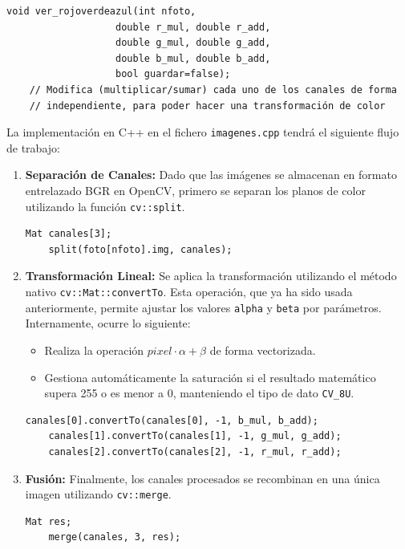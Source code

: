 \documentclass[11pt]{article}
\begin{document}
          \begin{lstlisting}[style=CppQtStyle, caption={Declaracion de enum \texttt{modelo\_color}.}, label={lst:imagenes-mc}]
    void ver_rojoverdeazul(int nfoto,
                   double r_mul, double r_add,
                   double g_mul, double g_add,
                   double b_mul, double b_add,
                   bool guardar=false);
    // Modifica (multiplicar/sumar) cada uno de los canales de forma
    // independiente, para poder hacer una transformación de color
\end{lstlisting}

          \noindent
          La implementación en C++ en el fichero \texttt{imagenes.cpp} tendrá el siguiente flujo de trabajo:

          \begin{enumerate}
              \item \textbf{Separación de Canales:} Dado que las imágenes se almacenan en formato entrelazado BGR en OpenCV, primero se separan los planos de color utilizando la función \texttt{cv::split}.

                    \begin{lstlisting}[style=CppQtStyle]
    Mat canales[3];
    split(foto[nfoto].img, canales);
\end{lstlisting}

                    \clearpage

              \item \textbf{Transformación Lineal:} Se aplica la transformación utilizando el método nativo \texttt{cv::Mat::convertTo}. Esta operación, que ya ha sido usada anteriormente, permite ajustar los valores \texttt{alpha} y \texttt{beta} por parámetros. Internamente, ocurre lo siguiente: \cite{opencv_convertTo_function}
                    \begin{itemize}
                        \item Realiza la operación $pixel \cdot \alpha + \beta$ de forma vectorizada.
                        \item Gestiona automáticamente la saturación si el resultado matemático supera 255 o
                              es menor a 0, manteniendo el tipo de dato \texttt{CV\_8U}.
                    \end{itemize}

                    \begin{lstlisting}[style=CppQtStyle]
    canales[0].convertTo(canales[0], -1, b_mul, b_add);
    canales[1].convertTo(canales[1], -1, g_mul, g_add);
    canales[2].convertTo(canales[2], -1, r_mul, r_add);
\end{lstlisting}

              \item \textbf{Fusión:} Finalmente, los canales procesados se recombinan en una única imagen utilizando \texttt{cv::merge}.

                    \begin{lstlisting}[style=CppQtStyle]
    Mat res;
    merge(canales, 3, res);
\end{lstlisting}

          \end{enumerate}
\end{document}

